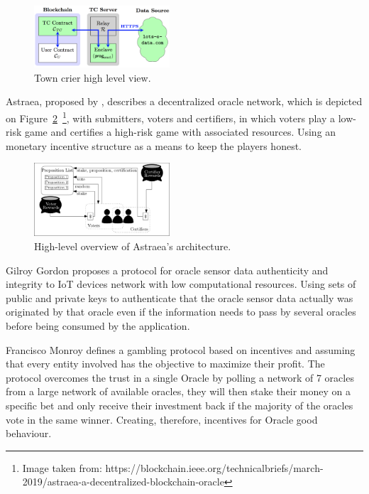\documentclass[final,3p,12pt,twocolumn]{elsarticle}
\begin{document}
\begin{figure}[H]
  \begin{center}
    \leavevmode
    \includegraphics[width=0.45\textwidth]{figures/town-crier.png}
    \caption{Town crier high level view.}
    \label{fig:/figures/town-crier}
  \end{center}
\end{figure}


Astraea, proposed by \citet{Adler2018}, describes a decentralized oracle network, which is depicted on Figure~\ref{fig:/figures/astraea}~\footnote{Image taken from: https://blockchain.ieee.org/technicalbriefs/march-2019/astraea-a-decentralized-blockchain-oracle}, with submitters, voters and certifiers, in which voters play a low-risk game and certifies a high-risk game with associated resources. Using an monetary incentive structure as a means to keep the players honest.

\begin{figure}[H]
  \begin{center}
    \leavevmode
    \includegraphics[width=0.45\textwidth]{figures/astraea.jpg}
    \caption{High-level overview of Astraea's architecture.}
    \label{fig:/figures/astraea}
  \end{center}
\end{figure}

Gilroy Gordon \cite{Gordon2017} proposes a protocol for oracle sensor data authenticity and integrity to IoT devices network with low computational resources. Using sets of public and private keys to authenticate that the oracle sensor data actually was originated by that oracle even if the information needs to pass by several oracles before being consumed by the application.

Francisco Monroy \cite{MontotoMonroy2018} defines a gambling protocol based on incentives and assuming that every entity involved has the objective to maximize their profit. The protocol overcomes the trust in a single Oracle by polling a network of 7 oracles from a large network of available oracles, they will then stake their money on a specific bet and only receive their investment back if the majority of the oracles vote in the same winner. Creating, therefore, incentives for Oracle good behaviour.
\end{document}
